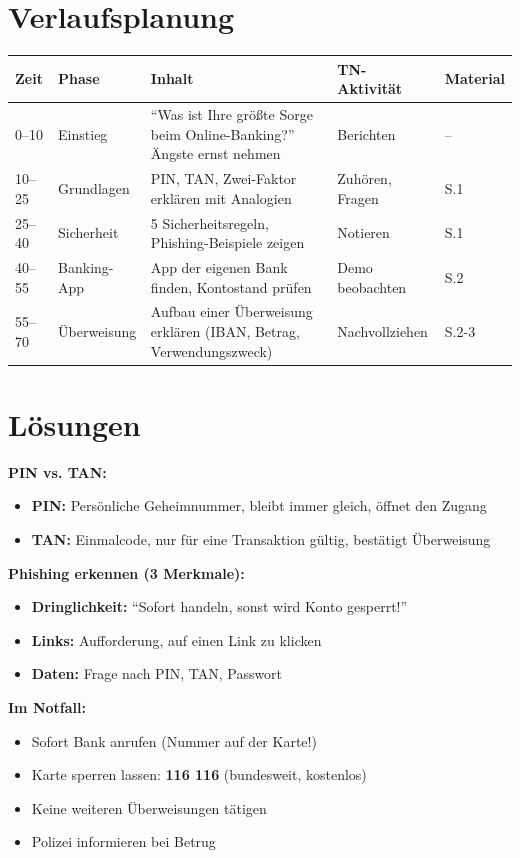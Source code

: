 \documentclass[11pt,a4paper]{article}
\begin{document}
\section{Verlaufsplanung}

\begin{longtable}{|p{1cm}|p{2cm}|p{5cm}|p{3cm}|p{2cm}|}
\hline
\textbf{Zeit} & \textbf{Phase} & \textbf{Inhalt} & \textbf{TN-Aktivität} & \textbf{Material} \\
\hline
0--10 & Einstieg & ``Was ist Ihre größte Sorge beim Online-Banking?'' Ängste ernst nehmen & Berichten & -- \\
\hline
10--25 & Grundlagen & PIN, TAN, Zwei-Faktor erklären mit Analogien & Zuhören, Fragen & S.1 \\
\hline
25--40 & Sicherheit & 5 Sicherheitsregeln, Phishing-Beispiele zeigen & Notieren & S.1 \\
\hline
40--55 & Banking-App & App der eigenen Bank finden, Kontostand prüfen & Demo beobachten & S.2 \\
\hline
55--70 & Überweisung & Aufbau einer Überweisung erklären (IBAN, Betrag, Verwendungszweck) & Nachvollziehen & S.2-3 \\
\hline
\end{longtable}

\section{Lösungen}

\textbf{PIN vs. TAN:}
\begin{itemize}
    \item \textbf{PIN:} Persönliche Geheimnummer, bleibt immer gleich, öffnet den Zugang
    \item \textbf{TAN:} Einmalcode, nur für eine Transaktion gültig, bestätigt Überweisung
\end{itemize}

\textbf{Phishing erkennen (3 Merkmale):}
\begin{itemize}
    \item \textbf{Dringlichkeit:} ``Sofort handeln, sonst wird Konto gesperrt!''
    \item \textbf{Links:} Aufforderung, auf einen Link zu klicken
    \item \textbf{Daten:} Frage nach PIN, TAN, Passwort
\end{itemize}

\textbf{Im Notfall:}
\begin{itemize}
    \item Sofort Bank anrufen (Nummer auf der Karte!)
    \item Karte sperren lassen: \textbf{116 116} (bundesweit, kostenlos)
    \item Keine weiteren Überweisungen tätigen
    \item Polizei informieren bei Betrug
\end{itemize}
\end{document}
